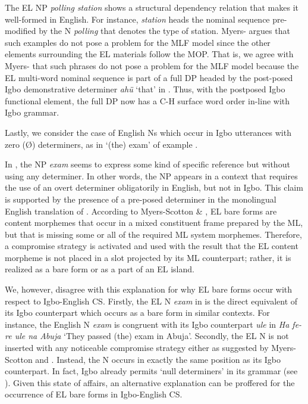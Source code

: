 \documentclass[output=paper]{langsci/langscibook}
\begin{document}
The EL NP \textit{polling station}\textbf{\textit{}} shows a structural dependency relation that makes it well-formed in English. For instance, \textit{station} heads the nominal sequence pre-modified by the N \textit{polling} that denotes the type of station. Myers-\citet{Scotton2002} argues that such examples do not pose a problem for the MLF model since the other elements surrounding the EL materials follow the MOP. That is, we agree with Myers-\citet[139]{Scotton2002} that such phrases do not pose a problem for the MLF model because the EL multi-word nominal sequence is part of a full DP headed by the post-posed Igbo demonstrative determiner \textit{ahü} ‘that’ in . Thus, with the postposed Igbo functional element, the full DP now has a C-H surface word order in-line with Igbo grammar. 

Lastly, we consider the case of English Ns which occur in Igbo utterances with zero (Ø) determiners, as in ‘(the) exam’ of example . 

In , the NP \textit{exam} seems to express some kind of specific reference but without using any determiner. In other words, the NP appears in a context that requires the use of an overt determiner obligatorily in English, but not in Igbo. This claim is supported by the presence of a pre-posed determiner in the monolingual English translation of . According to Myers-Scotton \& \citet[106]{Jake2001}, EL bare forms are content morphemes that occur in a mixed constituent frame prepared by the ML, but that is missing some or all of the required ML system morphemes. Therefore, a compromise strategy is activated and used with the result that the EL content morpheme is not placed in a slot projected by its ML counterpart; rather, it is realized as a bare form or as a part of an EL island. 

We, however, disagree with this explanation for why EL bare forms occur with respect to Igbo-English CS. Firstly, the EL N \textit{exam} in  is the direct equivalent of its Igbo counterpart which occurs as a bare form in similar contexts. For instance, the English N \textit{exam} is congruent with its Igbo counterpart \textit{ule} in \textit{Ha fe-re ule na Abuja} ‘They passed (the) exam in Abuja’. Secondly, the EL N is not inserted with any noticeable compromise strategy either as suggested by Myers-Scotton and \citet[106]{Jake2001}. Instead, the N occurs in exactly the same position as its Igbo counterpart. In fact, Igbo already permits ‘null determiners’ in its grammar (see \citealt[64--65]{Obiamalu2013}). Given this state of affairs, an alternative explanation can be proffered for the occurrence of EL bare forms in Igbo-English CS. 
\end{document}
